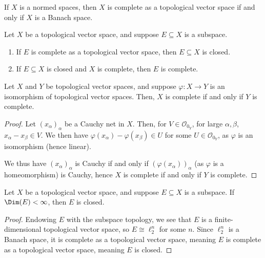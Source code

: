 \documentclass[10pt]{mypackage}
\begin{document}
\begin{corollary}
  If $X$ is a normed spaces, then $X$ is complete as a topological vector space if and only if $X$ is a Banach space.
\end{corollary}
\begin{proposition}
  Let $X$ be a topological vector space, and suppose $E\subseteq X$ is a subspace.
  \begin{enumerate}[(1)]
    \item If $E$ is complete as a topological vector space, then $E\subseteq X$ is closed.
    \item If $E\subseteq X$ is closed and $X$ is complete, then $E$ is complete.
  \end{enumerate}
\end{proposition}
\begin{proposition}
  Let $X$ and $Y$ be topological vector spaces, and suppose $\varphi: X\rightarrow Y$ is an isomorphism of topological vector spaces. Then, $X$ is complete if and only if $Y$ is complete.
\end{proposition}
\begin{proof}
  Let $\left(x_{\alpha}\right)_{\alpha}$ be a Cauchy net in $X$. Then, for $V\in \mathcal{O}_{0_Y}$, for large $\alpha,\beta$, $x_{\alpha} - x_{\beta}\in V$. We then have $\varphi\left(x_{\alpha}\right) - \varphi\left(x_{\beta}\right)\in U$ for some $U\in \mathcal{O}_{0_Y}$, as $\varphi$ is an isomorphism (hence linear).\newline

  We thus have $\left(x_{\alpha}\right)_{\alpha}$ is Cauchy if and only if $\left(\varphi\left(x_{\alpha}\right)\right)_{\alpha}$ (as $\varphi$ is a homeomorphism) is Cauchy, hence $X$ is complete if and only if $Y$ is complete.
\end{proof}
\begin{corollary}
  Let $X$ be a topological vector space, and suppose $E\subseteq X$ is a subspace. If $\Dim(E) < \infty$, then $E$ is closed.
\end{corollary}
\begin{proof}
  Endowing $E$ with the subspace topology, we see that $E$ is a finite-dimensional topological vector space, so $E\cong \ell_{2}^{n}$ for some $n$. Since $\ell_{2}^{n}$ is a Banach space, it is complete as a topological vector space, meaning $E$ is complete as a topological vector space, meaning $E$ is closed.
\end{proof}
\end{document}

